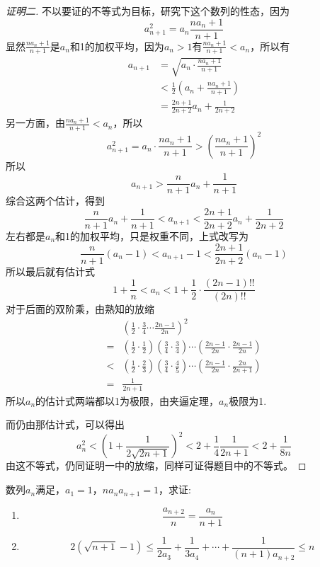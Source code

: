 \begin{proof}[证明二]
 不以要证的不等式为目标，研究下这个数列的性态，因为
\[ a_{n+1}^2=a_n \frac{na_n+1}{n+1} \]
显然$\frac{na_n+1}{n+1}$是$a_n$和1的加权平均，因为$a_n>1$有$\frac{na_n+1}{n+1}<a_n$，所以有
\begin{align*}
a_{n+1} &=\sqrt{a_n\cdot \frac{na_n+1}{n+1}} \\
& <\frac{1}{2} \left( a_n+\frac{na_n+1}{n+1} \right)  \\
& = \frac{2n+1}{2n+2}a_n+\frac{1}{2n+2}
\end{align*}
另一方面，由$\frac{na_n+1}{n+1}<a_n$，所以
\[ a_{n+1}^2=a_n \cdot  \frac{na_n+1}{n+1} > \left( \frac{na_n+1}{n+1} \right)^2 \]
所以
\[ a_{n+1}>\frac{n}{n+1}a_n+\frac{1}{n+1} \]
综合这两个估计，得到
\[ \frac{n}{n+1}a_n+\frac{1}{n+1} < a_{n+1} < \frac{2n+1}{2n+2}a_n+\frac{1}{2n+2} \]
左右都是$a_n$和1的加权平均，只是权重不同，上式改写为
\[ \frac{n}{n+1}(a_n-1) < a_{n+1}-1 < \frac{2n+1}{2n+2} (a_n-1) \]
所以最后就有估计式
\[ 1+\frac{1}{n} < a_n < 1 + \frac{1}{2} \cdot \frac{(2n-1)!!}{(2n)!!} \]
对于后面的双阶乘，由熟知的放缩
\begin{align*}
& \left( \frac{1}{2} \cdot \frac{3}{4} \cdots \frac{2n-1}{2n} \right)^2 \\
={} & \left( \frac{1}{2} \cdot \frac{1}{2} \right) \left(\frac{3}{4} \cdot \frac{3}{4} \right) \cdots \left( \frac{2n-1}{2n} \cdot \frac{2n-1}{2n} \right) \\
<{} & \left( \frac{1}{2} \cdot \frac{2}{3} \right) \left( \frac{3}{4} \cdot \frac{4}{5} \right) \cdots \left( \frac{2n-1}{2n} \cdot \frac{2n}{2n+1} \right) \\
={} & \frac{1}{2n+1}
\end{align*}
所以$a_n$的估计式两端都以1为极限，由夹逼定理，$a_n$极限为1.

而仍由那估计式，可以得出
\[ a_n^2< \left( 1+\frac{1}{2\sqrt{2n+1}} \right)^2 <2+\frac{1}{4} \frac{1}{2n+1} < 2+\frac{1}{8n} \]
由这不等式，仍同证明一中的放缩，同样可证得题目中的不等式。 
\end{proof}

\begin{exercise}
  数列$a_n$满足，$a_1=1$，$na_na_{n+1}=1$，求证: 
  \begin{enumerate}
  \item
    \[ \frac{a_{n+2}}{n} = \frac{a_n}{n+1} \]
  \item
    \[ 2(\sqrt{n+1}-1) \leqslant \frac{1}{2a_3}+\frac{1}{3a_4}+\cdots+\frac{1}{(n+1)a_{n+2}} \leqslant n \]
  \end{enumerate}
\end{exercise}

